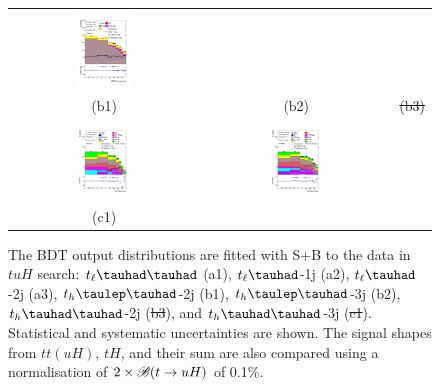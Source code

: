 \documentclass[PAPER, coverpage, atlasdraft=true, texlive=2016, UKenglish]{\ATLASLATEXPATH atlasdoc}
\providecommand{\DIFadd}[1]{{\protect\color{blue}\uwave{#1}}} %
\providecommand{\DIFdel}[1]{{\protect\color{red}\sout{#1}}}                      %
\providecommand{\DIFaddFL}[1]{\DIFadd{#1}} %
\providecommand{\DIFdelFL}[1]{\DIFdel{#1}} %
\providecommand{\DIFaddbeginFL}{} %
\providecommand{\DIFaddendFL}{} %
\providecommand{\DIFdelbeginFL}{} %
\providecommand{\DIFdelendFL}{} %
\begin{document}
\begin{figure}[H]
\begin{tabular}{@{}ccc@{}}
\includegraphics[width=0.3\textwidth]{figures/tuH_reg1l1tau1b3j_os.pdf}&\DIFdelbeginFL %
\DIFdelendFL \\
(b1) & (b2)&   \DIFdelbeginFL \DIFdelFL{(b3)  }\DIFdelendFL \\
\DIFaddbeginFL \includegraphics[width=0.3\textwidth]{figures/tuH_reg2mtau1b2jos.pdf}&
\DIFaddendFL \includegraphics[width=0.3\textwidth]{figures/tuH_reg2mtau1b3jos.pdf}& \\
(c1) \DIFaddbeginFL & \DIFaddFL{(c2)}& \DIFaddendFL \\
\end{tabular}
\caption{ The BDT output distributions are fitted with S+B to the data in $tuH$ search: $t_{\ell}\thadhad$ (a1),  $t_{\ell}\tauhad$-1j (a2),  $t_{\ell}\tauhad$-2j (a3),
  $t_h\tlhad$-2j (b1), $t_h\tlhad$-3j (b2), $t_h\thadhad$-2j (\DIFdelbeginFL \DIFdelFL{b3}\DIFdelendFL \DIFaddbeginFL \DIFaddFL{c1}\DIFaddendFL ), and $t_h\thadhad$-3j (\DIFdelbeginFL \DIFdelFL{c1}\DIFdelendFL \DIFaddbeginFL \DIFaddFL{c2}\DIFaddendFL ). Statistical and systematic uncertainties are shown. The signal shapes
  from $tt(uH)$, $tH$, and their sum are also compared using a normalisation of $2 \times\mathscr{B}(t\to uH)$ of 0.1\%. 
}
\label{fig:asimov_postfitbdtHu}
\end{figure}
\end{document}
